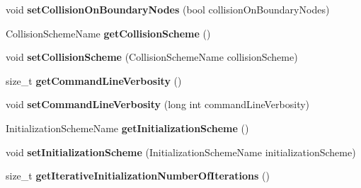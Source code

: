 \begin{DoxyCompactItemize}
\item 
\hypertarget{classnatrium_1_1SolverConfiguration_a12179b09400d5502f70c79060e0235bb}{void {\bfseries set\-Collision\-On\-Boundary\-Nodes} (bool collision\-On\-Boundary\-Nodes)}\label{classnatrium_1_1SolverConfiguration_a12179b09400d5502f70c79060e0235bb}

\item 
\hypertarget{classnatrium_1_1SolverConfiguration_a90e61c6fa9387a1cbf5943674bf307a8}{Collision\-Scheme\-Name {\bfseries get\-Collision\-Scheme} ()}\label{classnatrium_1_1SolverConfiguration_a90e61c6fa9387a1cbf5943674bf307a8}

\item 
\hypertarget{classnatrium_1_1SolverConfiguration_a5e7241337aa70cbe4b8af29c9cb5cfe8}{void {\bfseries set\-Collision\-Scheme} (Collision\-Scheme\-Name collision\-Scheme)}\label{classnatrium_1_1SolverConfiguration_a5e7241337aa70cbe4b8af29c9cb5cfe8}

\item 
\hypertarget{classnatrium_1_1SolverConfiguration_ac1954ee6d225807f947222c437fcd6a4}{size\-\_\-t {\bfseries get\-Command\-Line\-Verbosity} ()}\label{classnatrium_1_1SolverConfiguration_ac1954ee6d225807f947222c437fcd6a4}

\item 
\hypertarget{classnatrium_1_1SolverConfiguration_a906afb09b544bf2137c0d3bf9214b4a5}{void {\bfseries set\-Command\-Line\-Verbosity} (long int command\-Line\-Verbosity)}\label{classnatrium_1_1SolverConfiguration_a906afb09b544bf2137c0d3bf9214b4a5}

\item 
\hypertarget{classnatrium_1_1SolverConfiguration_afe9fd2087df0ab6066f260bf6bfd03ac}{Initialization\-Scheme\-Name {\bfseries get\-Initialization\-Scheme} ()}\label{classnatrium_1_1SolverConfiguration_afe9fd2087df0ab6066f260bf6bfd03ac}

\item 
\hypertarget{classnatrium_1_1SolverConfiguration_a4d867b8b8c0c08fc68b95f1a1a52c95d}{void {\bfseries set\-Initialization\-Scheme} (Initialization\-Scheme\-Name initialization\-Scheme)}\label{classnatrium_1_1SolverConfiguration_a4d867b8b8c0c08fc68b95f1a1a52c95d}

\item 
\hypertarget{classnatrium_1_1SolverConfiguration_aa12123336ffa7489780baa45d99569b1}{size\-\_\-t {\bfseries get\-Iterative\-Initialization\-Number\-Of\-Iterations} ()}\label{classnatrium_1_1SolverConfiguration_aa12123336ffa7489780baa45d99569b1}


\end{DoxyCompactItemize}
